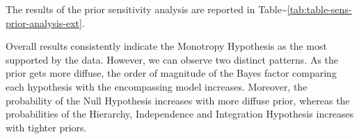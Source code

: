 \documentclass[
]{book}
\begin{document}
The results of the prior sensitivity analysis are reported in Table\textasciitilde\ref{tab:table-sens-prior-analysis-ext}.

\begin{table}[!h]

\caption{\label{tab:table-sens-prior-analysis-ext}Bayes factor encompassing model and hypothesis posterior probabilities (PP) under different prior settings  ($n_{subj} = 847$).}
\centering
{}
\end{table}

Overall results consistently indicate the Monotropy Hypothesis as the most supported by the data. However, we can observe two distinct patterns. As the prior gets more diffuse, the order of magnitude of the Bayes factor comparing each hypothesis with the encompassing model increases. Moreover, the probability of the Null Hypothesis increases with more diffuse prior, whereas the probabilities of the Hierarchy, Independence and Integration Hypothesis increases with tighter priors.
\end{document}
